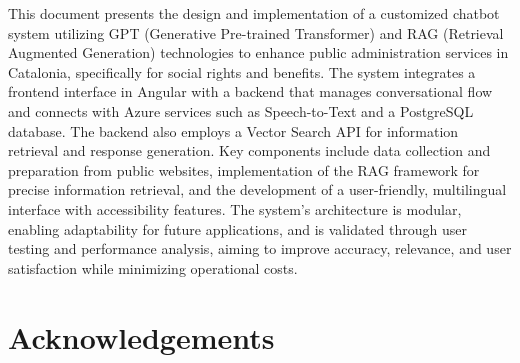 \documentclass[a4paper,12pt,twoside]{ThesisStyle}
\begin{document}

This document presents the design and implementation of a customized chatbot system utilizing GPT (Generative Pre-trained Transformer) and RAG (Retrieval Augmented Generation) technologies to enhance public administration services in Catalonia, specifically for social rights and benefits. The system integrates a frontend interface in Angular with a backend that manages conversational flow and connects with Azure services such as Speech-to-Text and a PostgreSQL database. The backend also employs a Vector Search API for information retrieval and response generation. Key components include data collection and preparation from public websites, implementation of the RAG framework for precise information retrieval, and the development of a user-friendly, multilingual interface with accessibility features. The system's architecture is modular, enabling adaptability for future applications, and is validated through user testing and performance analysis, aiming to improve accuracy, relevance, and user satisfaction while minimizing operational costs.

\chapter*{Acknowledgements}
\label{cap:acknowledgements}
\end{document}
